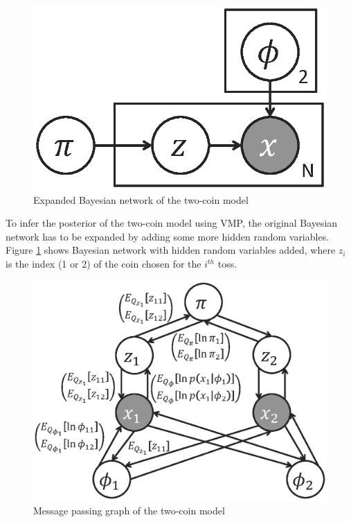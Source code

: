 \begin{figure}[h]
	\centering
	\includegraphics[scale=0.5,clip]{figs/two_coins_latent.eps}
	\caption{Expanded Bayesian network of the two-coin model}
	\label{fig:two_coin_bn}
\end{figure}

To infer the posterior of the two-coin model using VMP,
the original Bayesian network has to be expanded by 
adding some more hidden random variables.
Figure \ref{fig:two_coin_bn}
shows Bayesian network with hidden random variables added,
where $z_i$ is the index (1 or 2) of the coin chosen for the $i^{th}$ toss.

\begin{figure}[h]
	\centering
	\includegraphics[scale=0.5,clip]{figs/two_coins_mpg.eps}
	\caption{Message passing graph of the two-coin model}
	\label{fig:two_coins_mpg}
\end{figure}

